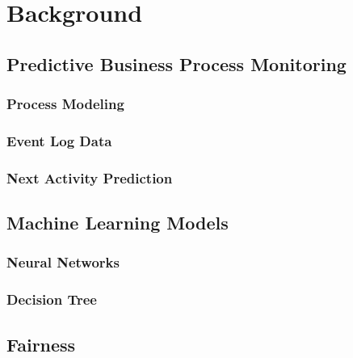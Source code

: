 \chapter{Background}


\section{Predictive Business Process Monitoring}

\subsection*{Process Modeling}



\subsection*{Event Log Data}


\subsection*{Next Activity Prediction}


\section{Machine Learning Models}

\subsection*{Neural Networks}






\subsection*{Decision Tree}






\section{Fairness}



